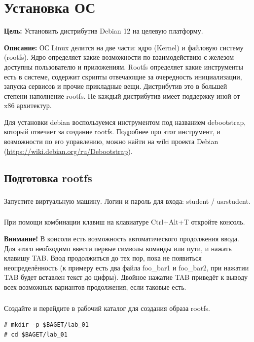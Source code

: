 \chapter{Установка ОС}
\textbf{Цель:} Установить дистрибутив Debian 12 на целевую платформу.

\vspace{5mm}
\textbf{Описание:} ОС Linux делится на две части: ядро (Kernel) и файловую систему (rootfs). Ядро определяет какие возможности по взаимодействию с железом доступны пользователю и приложениям. Rootfs определяет какие инструменты есть в системе, содержит скрипты отвечающие за очередность инициализации, запуска сервисов и прочие прикладные вещи. Дистрибутив это в большей степени наполнение rootfs. Не каждый дистрибутив имеет поддержку иной от x86 архитектур.

Для установки debian воспользуемся инструментом под названием debootstrap, который отвечает за создание rootfs. Подробнее про этот инструмент, и возможности по его управлению, можно найти на wiki проекта Debian (\href{https://wiki.debian.org/ru/Debootstrap}{https://wiki.debian.org/ru/Debootstrap}).


\section{Подготовка rootfs}

\subsection{}Запустите виртуальную машину. Логин и пароль для входа: student / usrstudent.

\subsection{} При помощи комбинации клавиш на клавиатуре Ctrl+Alt+T откройте консоль.

\vspace{5mm}
\textbf{Внимание!} В консоли есть возможность автоматического продолжения ввода. Для этого необходимо ввести первые символы команды или пути, и нажать клавишу TAB. Ввод продолжиться до тех пор, пока не появиться неопределённость (к примеру есть два файла foo\_bar1 и foo\_bar2, при нажатии TAB будет вставлен текст до цифры). Двойное нажатие TAB приведёт к выводу всех возможных вариантов продолжения, если таковые есть.

\subsection{}Создайте и перейдите в рабочий каталог для создания образа rootfs.
\begin{lstlisting}[style=bash]
# mkdir -p $BAGET/lab_01
# cd $BAGET/lab_01 
\end{lstlisting}

